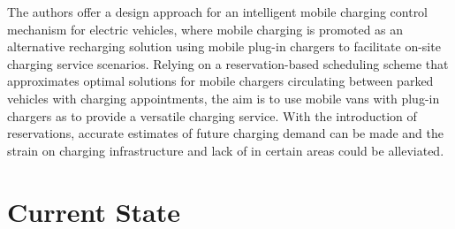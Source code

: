 The authors offer a design approach for an intelligent mobile charging control mechanism for electric vehicles, where mobile charging is promoted as an alternative recharging solution using mobile plug-in chargers to facilitate on-site charging service scenarios.
Relying on a reservation-based scheduling scheme that approximates optimal solutions for mobile chargers circulating between parked vehicles with charging appointments, the aim is to use mobile vans with plug-in chargers as  to provide a versatile charging service.
With the introduction of reservations, accurate estimates of future charging demand can be made and the strain on charging infrastructure and lack of  in certain areas could be alleviated.

\section{Current State}
\label{ch:Literature Review:sec:Current State}


